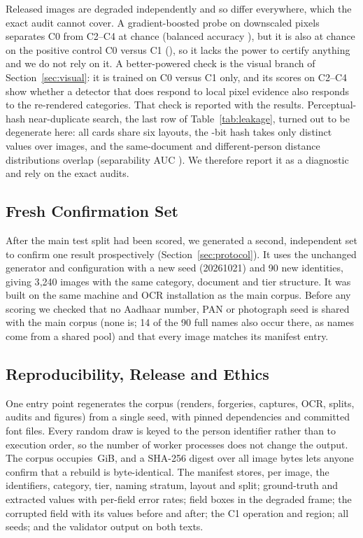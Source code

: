 \documentclass[conference]{IEEEtran}
\begin{document}
Released images are degraded independently and so differ everywhere,
which the exact audit cannot cover. A gradient-boosted probe on
downscaled pixels separates C0 from C2--C4 at chance (balanced accuracy
\dsProbeCritical), but it is also at chance on the positive control C0
versus C1 (\dsProbeControl), so it lacks the power to certify anything
and we do not rely on it. A better-powered check is the visual branch
of Section~\ref{sec:visual}: it is trained on C0 versus C1 only, and its
scores on C2--C4 show whether a detector that does respond to local
pixel evidence also responds to the re-rendered categories. That check
is reported with the results. Perceptual-hash near-duplicate search, the
last row of Table~\ref{tab:leakage}, turned out to be degenerate here:
all cards share six layouts, the \dsPhashBits-bit hash takes only
\dsPhashDistinct{} distinct values over \dsImages{} images, and the
same-document and different-person distance distributions overlap
(separability AUC \dsPhashAUC). We therefore report it as a diagnostic
and rely on the exact audits.

\subsection{Fresh Confirmation Set}
\label{subsec:fresh}

After the main test split had been scored, we generated a second,
independent set to confirm one result prospectively
(Section~\ref{sec:protocol}). It uses the unchanged generator and
configuration with a new seed (20261021) and 90 new identities, giving
3{,}240 images with the same category, document and tier structure. It
was built on the same machine and OCR installation as the main corpus.
Before any scoring we checked that no Aadhaar number, PAN or photograph
seed is shared with the main corpus (none is; 14 of the 90 full names
also occur there, as names come from a shared pool) and that every
image matches its manifest entry.

\subsection{Reproducibility, Release and Ethics}
\label{subsec:release}
\label{subsec:ethics}

One entry point regenerates the corpus (renders, forgeries, captures,
OCR, splits, audits and figures) from a single seed, with pinned
dependencies and committed font files. Every random draw is keyed to
the person identifier rather than to execution order, so the number of
worker processes does not change the output. The corpus occupies
\dsGiB\,GiB, and a SHA-256 digest over all image bytes lets anyone
confirm that a rebuild is byte-identical. The manifest stores, per
image, the identifiers, category, tier, naming stratum, layout and
split; ground-truth and extracted values with per-field error rates;
field boxes in the degraded frame; the corrupted field with its values
before and after; the C1 operation and region; all seeds; and the
validator output on both texts.
\end{document}
